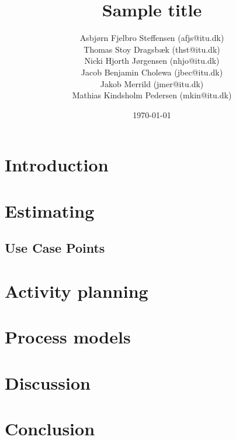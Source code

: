 \documentclass{report}
\title{Sample title}
\date{\today}
\author{Asbj\o rn Fjelbro Steffensen (afjs@itu.dk)\\ Thomas Stoy Dragsb\ae k (thst@itu.dk)\\ Nicki Hjorth J\o rgensen (nhjo@itu.dk)\\ Jacob Benjamin Cholewa (jbec@itu.dk)\\ Jakob Merrild (jmer@itu.dk)\\ Mathias Kindsholm Pedersen (mkin@itu.dk)}
\begin{document}
\maketitle
\newpage
\tableofcontents
\newpage

\chapter{Introduction}


\chapter{Estimating}
\section{Use Case Points}


\chapter{Activity planning}






\chapter{Process models}




\chapter{Discussion}

\chapter{Conclusion}
\end{document}
